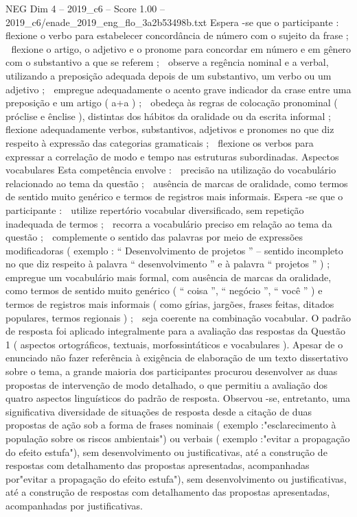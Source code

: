 \begin{textsample}{NEG Dim 4 – 2019\_c6 – Score 1.00 – 2019\_c6/enade\_2019\_eng\_flo\_3a2b53498b.txt}
Espera -se que o participante :  flexione o verbo para estabelecer concordância de número com o sujeito da frase ;  flexione o artigo, o adjetivo e o pronome para concordar em número e em gênero com o substantivo a que se referem ;  observe a regência nominal e a verbal, utilizando a preposição adequada depois de um substantivo, um verbo ou um adjetivo ;  empregue adequadamente o acento grave indicador da crase entre uma preposição e um artigo ( a+a ) ;  obedeça às regras de colocação pronominal ( próclise e ênclise ), distintas dos hábitos da oralidade ou da escrita informal ;  flexione adequadamente verbos, substantivos, adjetivos e pronomes no que diz respeito à expressão das categorias gramaticais ;  flexione os verbos para expressar a correlação de modo e tempo nas estruturas subordinadas.
Aspectos vocabulares Esta competência envolve :  precisão na utilização do vocabulário relacionado ao tema da questão ;  ausência de marcas de oralidade, como termos de sentido muito genérico e termos de registros mais informais.
Espera -se que o participante :  utilize repertório vocabular diversificado, sem repetição inadequada de termos ;  recorra a vocabulário preciso em relação ao tema da questão ;  complemente o sentido das palavras por meio de expressões modificadoras ( exemplo : “ Desenvolvimento de projetos ” – sentido incompleto no que diz respeito à palavra “ desenvolvimento ” e à palavra “ projetos ” ) ;  empregue um vocabulário mais formal, com ausência de marcas da oralidade, como termos de sentido muito genérico ( “ coisa ”, “ negócio ”, “ você ” ) e termos de registros mais informais ( como gírias, jargões, frases feitas, ditados populares, termos regionais ) ;  seja coerente na combinação vocabular.
O padrão de resposta foi aplicado integralmente para a avaliação das respostas da Questão 1 ( aspectos ortográficos, textuais, morfossintáticos e vocabulares ).
Apesar de o enunciado não fazer referência à exigência de elaboração de um texto dissertativo sobre o tema, a grande maioria dos participantes procurou desenvolver as duas propostas de intervenção de modo detalhado, o que permitiu a avaliação dos quatro aspectos linguísticos do padrão de resposta.
Observou -se, entretanto, uma significativa diversidade de situações de resposta desde a citação de duas propostas de ação sob a forma de frases nominais ( exemplo :"esclarecimento à população sobre os riscos ambientais") ou verbais ( exemplo :"evitar a propagação do efeito estufa"), sem desenvolvimento ou justificativas, até a construção de respostas com detalhamento das propostas apresentadas, acompanhadas por"evitar a propagação do efeito estufa"), sem desenvolvimento ou justificativas, até a construção de respostas com detalhamento das propostas apresentadas, acompanhadas por justificativas.

\end{textsample}
